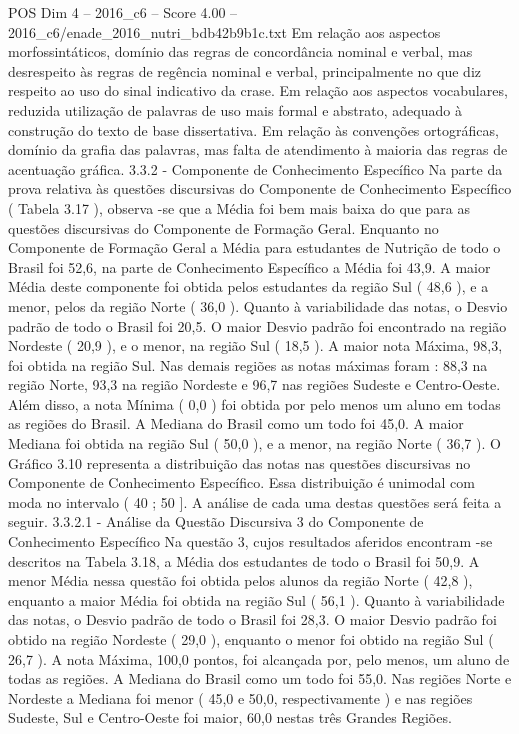 \begin{textsample}{POS Dim 4 – 2016\_c6 – Score 4.00 – 2016\_c6/enade\_2016\_nutri\_bdb42b9b1c.txt}
Em relação aos aspectos morfossintáticos, domínio das regras de concordância nominal e verbal, mas desrespeito às regras de regência nominal e verbal, principalmente no que diz respeito ao uso do sinal indicativo da crase.
Em relação aos aspectos vocabulares, reduzida utilização de palavras de uso mais formal e abstrato, adequado à construção do texto de base dissertativa.
Em relação às convenções ortográficas, domínio da grafia das palavras, mas falta de atendimento à maioria das regras de acentuação gráfica. 3.3.2 - Componente de Conhecimento Específico Na parte da prova relativa às questões discursivas do Componente de Conhecimento Específico ( Tabela 3.17 ), observa -se que a Média foi bem mais baixa do que para as questões discursivas do Componente de Formação Geral.
Enquanto no Componente de Formação Geral a Média para estudantes de Nutrição de todo o Brasil foi 52,6, na parte de Conhecimento Específico a Média foi 43,9.
A maior Média deste componente foi obtida pelos estudantes da região Sul ( 48,6 ), e a menor, pelos da região Norte ( 36,0 ).
Quanto à variabilidade das notas, o Desvio padrão de todo o Brasil foi 20,5.
O maior Desvio padrão foi encontrado na região Nordeste ( 20,9 ), e o menor, na região Sul ( 18,5 ).
A maior nota Máxima, 98,3, foi obtida na região Sul.
Nas demais regiões as notas máximas foram : 88,3 na região Norte, 93,3 na região Nordeste e 96,7 nas regiões Sudeste e Centro-Oeste.
Além disso, a nota Mínima ( 0,0 ) foi obtida por pelo menos um aluno em todas as regiões do Brasil.
A Mediana do Brasil como um todo foi 45,0.
A maior Mediana foi obtida na região Sul ( 50,0 ), e a menor, na região Norte ( 36,7 ).
O Gráfico 3.10 representa a distribuição das notas nas questões discursivas no Componente de Conhecimento Específico.
Essa distribuição é unimodal com moda no intervalo ( 40 ; 50 ].
A análise de cada uma destas questões será feita a seguir. 3.3.2.1 - Análise da Questão Discursiva 3 do Componente de Conhecimento Específico Na questão 3, cujos resultados aferidos encontram -se descritos na Tabela 3.18, a Média dos estudantes de todo o Brasil foi 50,9.
A menor Média nessa questão foi obtida pelos alunos da região Norte ( 42,8 ), enquanto a maior Média foi obtida na região Sul ( 56,1 ).
Quanto à variabilidade das notas, o Desvio padrão de todo o Brasil foi 28,3.
O maior Desvio padrão foi obtido na região Nordeste ( 29,0 ), enquanto o menor foi obtido na região Sul ( 26,7 ).
A nota Máxima, 100,0 pontos, foi alcançada por, pelo menos, um aluno de todas as regiões.
A Mediana do Brasil como um todo foi 55,0.
Nas regiões Norte e Nordeste a Mediana foi menor ( 45,0 e 50,0, respectivamente ) e nas regiões Sudeste, Sul e Centro-Oeste foi maior, 60,0 nestas três Grandes Regiões.

\end{textsample}
